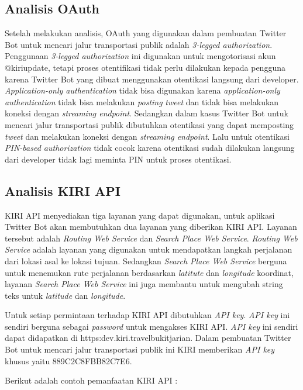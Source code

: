 \subsection{Analisis OAuth}
Setelah melakukan analisis, OAuth yang digunakan dalam pembuatan Twitter Bot untuk mencari jalur transportasi publik adalah \textit{3-legged authorization}. Penggunaan \textit{3-legged authorization} ini digunakan untuk mengotorisasi akun @kiriupdate, tetapi proses otentifikasi tidak perlu dilakukan kepada pengguna karena Twitter Bot yang dibuat menggunakan otentikasi langsung dari developer. \textit{Application-only authentication} tidak bisa digunakan karena \textit{application-only authentication} tidak bisa melakukan \textit{posting} \textit{tweet} dan tidak bisa melakukan koneksi dengan \textit{streaming endpoint}. Sedangkan dalam kasus Twitter Bot untuk mencari jalur transportasi publik dibutuhkan otentikasi yang dapat memposting \textit{tweet} dan melakukan koneksi dengan \textit{streaming endpoint}. Lalu untuk otentikasi \textit{PIN-based authorization} tidak cocok karena otentikasi sudah dilakukan langsung dari developer tidak lagi meminta PIN untuk proses otentikasi.

\subsection{Analisis KIRI API}
KIRI API menyediakan tiga layanan yang dapat digunakan, untuk aplikasi Twitter Bot akan membutuhkan dua layanan yang diberikan KIRI API. Layanan tersebut adalah \textit{Routing Web Service} dan \textit{Search Place Web Service}. \textit{Routing Web Service} adalah layanan yang digunakan untuk mendapatkan langkah perjalanan dari lokasi asal ke lokasi tujuan. Sedangkan \textit{Search Place Web Service} berguna untuk menemukan rute perjalanan berdasarkan \textit{latitute} dan \textit{longitude} koordinat,  layanan \textit{Search Place Web Service} ini juga membantu untuk mengubah string teks untuk \textit{latitude} dan \textit{longitude}.

Untuk setiap permintaan terhadap KIRI API dibutuhkan \textit{API key}. \textit{API key} ini sendiri berguna sebagai \textit{password} untuk mengakses KIRI API. \textit{API key} ini sendiri dapat didapatkan di https:\/\/dev.kiri.travel\/bukitjarian\/. Dalam pembuatan Twitter Bot untuk mencari jalur transportasi publik ini KIRI memberikan \textit{API key} khusus yaitu 889C2C8FBB82C7E6.

Berikut adalah contoh pemanfaatan KIRI API :

